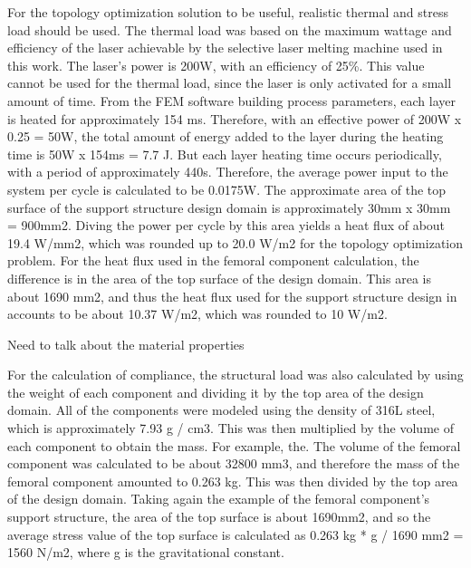 \documentclass[../main.tex]{subfiles}
\begin{document}
For the topology optimization solution to be useful, realistic thermal and stress load should be used. The thermal load was based on the maximum wattage and efficiency of the laser achievable by the selective laser melting machine used in this work. The laser's power is 200W, with an efficiency of 25\%. This value cannot be used for the thermal load, since the laser is only activated for a small amount of time. From the FEM software building process parameters, each layer is heated for approximately 154 ms. Therefore, with an effective power of 200W x 0.25 = 50W, the total amount of energy added to the layer during the heating time is 50W x 154ms = 7.7 J. But each layer heating time occurs periodically, with a period of approximately 440s. Therefore, the average power input to the system per cycle is calculated to be 0.0175W. The approximate area of the top surface of the support structure design domain is approximately 30mm x 30mm = 900mm2. Diving the power per cycle by this area yields a heat flux of about 19.4 W/mm2, which was rounded up to 20.0 W/m2 for the topology optimization problem. For the heat flux used in the femoral component calculation, the difference is in the area of the top surface of the design domain. This area is about 1690 mm2, and thus the heat flux used for the support structure design in accounts to be about 10.37 W/m2, which was rounded to 10 W/m2.

Need to talk about the material properties



For the calculation of compliance, the structural load was also calculated by using the weight of each component and dividing it by the top area of the design domain. All of the components were modeled using the density of 316L steel, which is approximately 7.93 g / cm3. This was then multiplied by the volume of each component to obtain the mass. For example, the. The volume of the femoral component was calculated to be about 32800 mm3, and therefore the mass of the femoral component amounted to 0.263 kg. This was then divided by the top area of the design domain. Taking again the example of the femoral component's support structure, the area of the top surface is about 1690mm2, and so the average stress value of the top surface is calculated as 0.263 kg * g / 1690 mm2 = 1560 N/m2, where g is the gravitational constant. 
\end{document}
